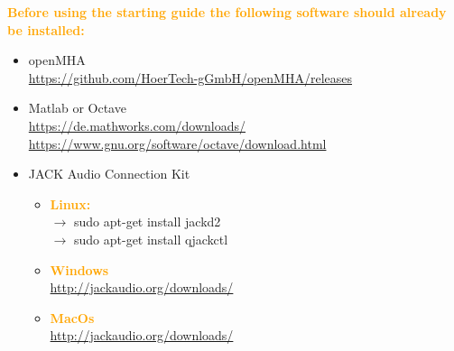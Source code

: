 \documentclass[11pt,a4paper,twoside]{article}
\newcommand{\+}{\discretionary{\mbox{\scriptsize$\hookleftarrow$}}{}{}}
\begin{document}
\textcolor{orange}{\textbf{Before using the starting guide the following software should already be installed:}}

\begin{itemize}
   \item \large{{openMHA}}   \\
     \footnotesize{\url{https://github.com/HoerTech-gGmbH/openMHA/releases}} 
   \item \large{{Matlab or Octave}}    \\
     \footnotesize{\url{https://de.mathworks.com/downloads/}} \\
     \footnotesize{\url{https://www.gnu.org/software/octave/download.html}}
   \item \large{{JACK Audio Connection Kit}}
   \begin{itemize}
   \item \textcolor{orange}{\textbf{Linux:}} \\
   $\rightarrow$ {\ttfamily sudo apt-get install jackd2} \\
   $\rightarrow$ {\ttfamily sudo apt-get install qjackctl}
   \item \textcolor{orange}{\textbf{Windows}} \\
   \footnotesize{\url{http://jackaudio.org/downloads/}}
   \item \textcolor{orange}{\textbf{\large{MacOs}}} \\
   \footnotesize{\url{http://jackaudio.org/downloads/}} %
   \end{itemize}
\end{itemize}

\end{document}
